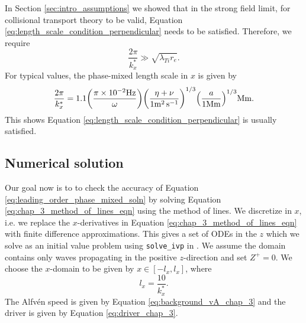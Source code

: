 In Section \ref{sec:intro_assumptions} we showed that in the strong field limit, for collisional transport theory to be valid, Equation \eqref{eq:length_scale_condition_perpendicular} needs to be satisfied. Therefore, we require
\begin{equation}
    \frac{2\pi}{k_x^*} \gg \sqrt{\lambda_{Ti} r_e}.
\end{equation}
For typical values, the phase-mixed length scale in $x$ is given by
\begin{equation}
    \frac{2\pi}{k_x^*}=1.1\qty(\frac{\pi\times10^{-2}\si{.Hz}}{\omega})\qty(\frac{\eta+\nu}{1\si{.m^2.s^{-1}}})^{1/3}\qty(\frac{a}{1\si{.Mm}})^{1/3}\si{.Mm}.
\end{equation}
This shows Equation \eqref{eq:length_scale_condition_perpendicular} is usually satisfied.

\subsection{Numerical solution}

Our goal now is to to check the accuracy of Equation \eqref{eq:leading_order_phase_mixed_soln} by solving Equation \eqref{eq:chap_3_method_of_lines_eqn} using the method of lines. We discretize in $x$, i.e. we replace the $x$-derivatives in Equation \eqref{eq:chap_3_method_of_lines_eqn} with finite difference approximations. This gives a set of ODEs in the $z$ which we solve as an initial value problem using \texttt{solve\_ivp} in \citet{SciPy2020}. We assume the domain contains only waves propagating in the positive $z$-direction and set $Z^{+}=0$. We choose the $x$-domain to be given by $x\in[-l_x,l_x]$, 
where
\[l_x = \frac{10}{k_x^*}.\]
The Alfv\'en speed is given by Equation \eqref{eq:background_vA_chap_3} and the driver is given by  Equation \eqref{eq:driver_chap_3}.

